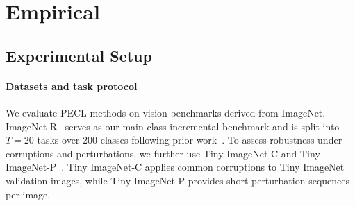 \documentclass{article}
\theoremstyle{plain}
\theoremstyle{definition}
\theoremstyle{remark}
\begin{document}












\section{Empirical}

\label{sec:results-local-global}





\subsection{Experimental Setup}






\paragraph{Datasets and task protocol}
We evaluate PECL methods on vision benchmarks derived from ImageNet. ImageNet-R~\cite{ImagenetR_Hendrycks_2021_ICCV} serves as our main class-incremental benchmark and is split into $T=20$ tasks over $200$ classes following prior work~\cite{liangInfLoRAInterferenceFreeLowRank2024a}.  To assess robustness under corruptions and perturbations, we further use Tiny ImageNet-C and Tiny ImageNet-P~\cite{hendrycks2018benchmarking}. 
Tiny ImageNet-C applies common corruptions to Tiny ImageNet validation images, while Tiny ImageNet-P provides short perturbation sequences per image.
\end{document}
